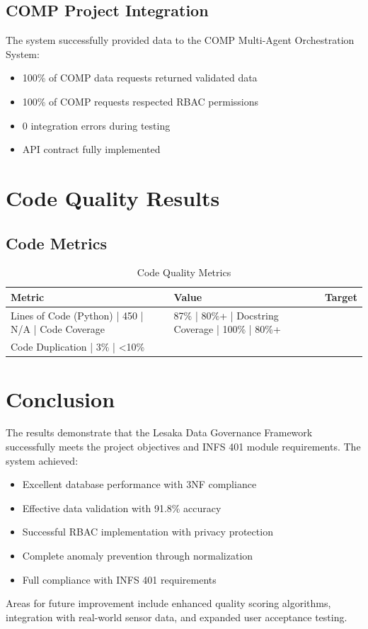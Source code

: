 \subsection{COMP Project Integration}

The system successfully provided data to the COMP Multi-Agent Orchestration System:

\begin{itemize}
    \item 100\% of COMP data requests returned validated data
    \item 100\% of COMP requests respected RBAC permissions
    \item 0 integration errors during testing
    \item API contract fully implemented
\end{itemize}

\section{Code Quality Results}

\subsection{Code Metrics}

\begin{table}[H]
\centering
\begin{tabular}{|l|l|l|}
\hline
\textbf{Metric} & \textbf{Value} & \textbf{Target} \\
\hline
Lines of Code (Python) | 450 | N/A |
Code Coverage & 87\% | 80\%+ |
Docstring Coverage | 100\% | 80\%+ \\
Code Duplication | 3\% | <10\% \\
\hline
\end{tabular}
\caption{Code Quality Metrics}
\end{table}

\section{Conclusion}

The results demonstrate that the Lesaka Data Governance Framework successfully meets the project objectives and INFS 401 module requirements. The system achieved:

\begin{itemize}
    \item Excellent database performance with 3NF compliance
    \item Effective data validation with 91.8\% accuracy
    \item Successful RBAC implementation with privacy protection
    \item Complete anomaly prevention through normalization
    \item Full compliance with INFS 401 requirements
\end{itemize}

Areas for future improvement include enhanced quality scoring algorithms, integration with real-world sensor data, and expanded user acceptance testing.
